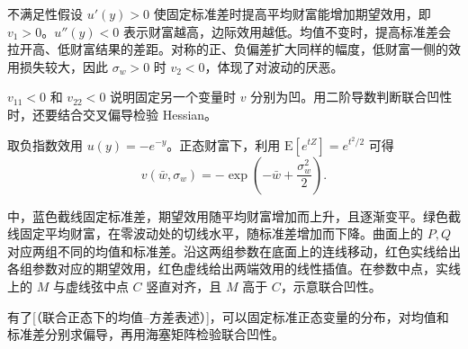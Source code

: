 不满足性假设 $u'(y)>0$ 使固定标准差时提高平均财富能增加期望效用，即 $v_1>0$。$u''(y)<0$ 表示财富越高，边际效用越低。均值不变时，提高标准差会拉开高、低财富结果的差距。对称的正、负偏差扩大同样的幅度，低财富一侧的效用损失较大，因此 $\sigma_w>0$ 时 $v_2<0$，体现了对波动的厌恶。

$v_{11}<0$ 和 $v_{22}<0$ 说明固定另一个变量时 $v$ 分别为凹。用二阶导数判断联合凹性时，还要结合交叉偏导检验 Hessian。

取负指数效用 $u(y)=-e^{-y}$。正态财富下，利用 $\mathrm E[e^{tZ}]=e^{t^2/2}$ 可得
\[
 v(\bar w,\sigma_w)=-\exp\!\left(-\bar w+\frac{\sigma_w^2}{2}\right).
\]

 中，蓝色截线固定标准差，期望效用随平均财富增加而上升，且逐渐变平。绿色截线固定平均财富，在零波动处的切线水平，随标准差增加而下降。曲面上的 $P,Q$ 对应两组不同的均值和标准差。沿这两组参数在底面上的连线移动，红色实线给出各组参数对应的期望效用，红色虚线给出两端效用的线性插值。在参数中点，实线上的 $M$ 与虚线弦中点 $C$ 竖直对齐，且 $M$ 高于 $C$，示意联合凹性。

\begin{center}
\begin{minipage}{\linewidth}
\centering
\renewcommand{\thewjFigure}{\thechapter.S\arabic{wjFigure}}%
%
\par
{}
\end{minipage}
\end{center}

有了[（联合正态下的均值--方差表述）]，可以固定标准正态变量的分布，对均值和标准差分别求偏导，再用海塞矩阵检验联合凹性。

